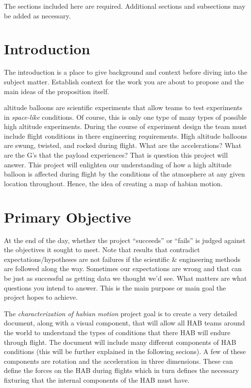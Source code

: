 \documentclass[journal]{SPEXformat}
\newenvironment{help}{
  \ttfamily\footnotesize\sloppy
  \begin{lrbox}{\helpbox}\begin{minipage}{\linewidth}
  }{
  \end{minipage}\end{lrbox}
  \ifbool{showhelp}{
    \fbox{\usebox{\helpbox}}
  }{}
}
\begin{document}
\printnomenclature{}
\begin{help}
  The sections included here are required. Additional sections and subsections may be added as necessary.
\end{help}
\section{Introduction}
\label{sec:introduction}
\begin{help}
  The introduction is a place to give background and context before diving into the subject matter.
  Establish context for the work you are about to propose and the main ideas of the proposition itself.
\end{help}

 altitude balloons are scientific experiments that allow teams to test experiments in \textit{space-like} conditions.
  Of course, this is only one type of many types of possible high altitude experiments. During the course of experiment
  design the team must include flight conditions in there engineering requirements. High altitude balloons are swung,
  twisted, and rocked during flight. What are the accelerations? What are the G's that the payload experiences?
  That is question this project will answer. This project will enlighten our understanding of how a high altitude balloon
  is affected during flight by the conditions of the atmosphere at any given location throughout. Hence, the idea
  of creating a map of habian motion.

\section{Primary Objective}
\label{sec:primary-obj}
\begin{help}
  At the end of the day, whether the project ``succeeds'' or ``fails'' is judged against the objectives it sought to meet.
  Note that results that contradict expectations/hypotheses are not failures if the scientific \& engineering methods are followed along the way.
  Sometimes our expectations are wrong and that can be just as successful as getting data we thought we'd see.
  What matters are what questions you intend to answer.
  This is the main purpose or main goal the project hopes to achieve.
\end{help}
  The \textit{characterization of habian motion} project goal is to create a very detailed document, along with a
  visual component, that will allow all HAB teams around the world to understand the types of conditions that
  there HAB will endure through flight. The document will include many different components of HAB conditions (this will be
  further explained in the following secions). A few of these components are rotation and the acceleration in
  three dimensions. These can define the forces on the HAB during flights which in turn defines the necessary fixturing
  that the internal components of the HAB must have.
\end{document}
